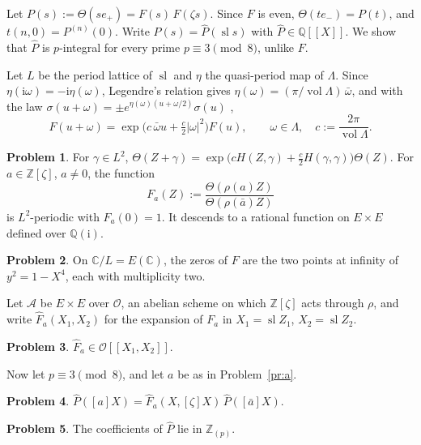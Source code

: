 \documentclass[reqno]{amsart}
\theoremstyle{definition}
\newtheorem{problem}{Problem}[section]
\theoremstyle{plain}
\newcommand{\Z}{\mathbb{Z}}
\newcommand{\Q}{\mathbb{Q}}
\newcommand{\C}{\mathbb{C}}
\newcommand{\ii}{\mathrm{i}}
\newcommand{\Oc}{\mathcal{O}}
\newcommand{\sll}{\operatorname{sl}}
\begin{document}
Let \(P(s) := \Theta(s e_+) = F(s)\, F(\zeta s)\).  Since \(F\) is even, \(\Theta(t e_-) = P(t)\), and \(t(n, 0) = P^{(n)}(0)\).  Write \(P(s) = \hat P(\sll s)\) with \(\hat P \in \Q[[X]]\).  We show that \(\hat P\) is \(p\)-integral for every prime \(p \equiv 3 \pmod 8\), unlike \(F\).

Let \(L\) be the period lattice of \(\sll\) and \(\eta\) the quasi-period map of \(\Lambda\).  Since \(\eta(\ii\omega) = -\ii\eta(\omega)\), Legendre's relation gives \(\eta(\omega) = (\pi/\operatorname{vol}\Lambda)\, \bar\omega\), and with the law \(\sigma(u + \omega) = \pm e^{\eta(\omega)(u + \omega/2)}\sigma(u)\) \cite[\S I.5]{Si2},
\[
  F(u + \omega) = \exp\bigl(c\, \bar\omega u + \tfrac{c}{2} \lvert\omega\rvert^2\bigr) F(u),
  \qquad \omega \in \Lambda,\quad c := \frac{2\pi}{\operatorname{vol}\Lambda} .
\]

\begin{problem}\label{pr:Fa}
For \(\gamma \in L^2\), \(\Theta(Z + \gamma) = \exp\bigl(c H(Z, \gamma) + \tfrac{c}{2}H(\gamma, \gamma)\bigr)\Theta(Z)\).  For \(a \in \Z[\zeta]\), \(a \ne 0\), the function
\[
  F_a(Z) := \frac{\Theta(\rho(a) Z)}{\Theta(\rho(\bar a) Z)}
\]
is \(L^2\)-periodic with \(F_a(0) = 1\).  It descends to a rational function on \(E \times E\) defined over \(\Q(\ii)\).
\end{problem}

\begin{problem}\label{pr:zeros}
On \(\C/L = E(\C)\), the zeros of \(F\) are the two points at infinity of \(y^2 = 1 - X^4\), each with multiplicity two.
\end{problem}

Let \(\mathcal{A}\) be \(E \times E\) over \(\Oc\), an abelian scheme on which \(\Z[\zeta]\) acts through \(\rho\), and write \(\hat F_a(X_1, X_2)\) for the expansion of \(F_a\) in \(X_1 = \sll Z_1\), \(X_2 = \sll Z_2\).

\begin{problem}\label{pr:Fa-integral}
\(\hat F_a \in \Oc[[X_1, X_2]]\).
\end{problem}

Now let \(p \equiv 3 \pmod 8\), and let \(a\) be as in Problem~\ref{pr:a}.

\begin{problem}\label{pr:functional}
\(\hat P([a]X) = \hat F_a(X, [\zeta]X)\, \hat P([\bar a]X)\).
\end{problem}

\begin{problem}\label{pr:BK-induction}
The coefficients of \(\hat P\) lie in \(\Z_{(p)}\).
\end{problem}
\end{document}
